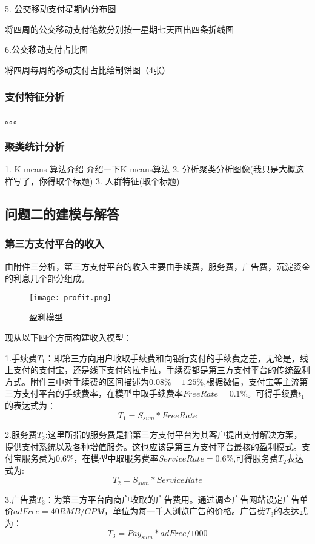 \documentclass[withoutpreface,bwprint]{cumcmthesis} %
\begin{document}
5. 公交移动支付星期内分布图

将四周的公交移动支付笔数分别按一星期七天画出四条折线图

6.公交移动支付占比图

将四周每周的移动支付占比绘制饼图（4张）

\subsubsection{支付特征分析}

。。。
\subsubsection{聚类统计分析}
1. K-means 算法介绍
介绍一下K-means算法
2. 分析聚类分析图像(我只是大概这样写了，你得取个标题)
3. 人群特征(取个标题)
\subsection{问题二的建模与解答}
\subsubsection{第三方支付平台的收入}
由附件三分析，第三方支付平台的收入主要由手续费，服务费，广告费，沉淀资金的利息几个部分组成。
\begin{figure}[htbp]
\centering
\texttt{[image: profit.png]}
\caption{盈利模型}
\end{figure}
现从以下四个方面构建收入模型：

1.手续费$T_1$：即第三方向用户收取手续费和向银行支付的手续费之差，无论是，线上支付的支付宝，还是线下支付的拉卡拉，手续费都是第三方支付平台的传统盈利方式。附件三中对手续费的区间描述为$0.08\%-1.25\%$,根据微信，支付宝等主流第三方支付平台的手续费率，在模型中取手续费率$FreeRate=0.1\%$。可得手续费$t_1$的表达式为：
\begin{equation}
T_1=S_{sum}*FreeRate
\end{equation}

2.服务费$T_2$:这里所指的服务费是指第三方支付平台为其客户提出支付解决方案，提供支付系统以及各种增值服务。这也应该是第三方支付平台最核的盈利模式。支付宝服务费为$0.6\%$，在模型中取服务费率$ServiceRate=​0.6\%$,可得服务费$T_2$表达式为:
\begin{equation}
T_2=S_{sum}*ServiceRate
\end{equation}

3.广告费$T_3$：为第三方平台向商户收取的广告费用。通过调查广告网站设定广告单价$adFree=40RMB/CPM$，单位为每一千人浏览广告的价格。广告费$T_3$的表达式为：
\begin{equation}
T_3=Pay_{sum}*adFree/1000
\end{equation}
\end{document}
